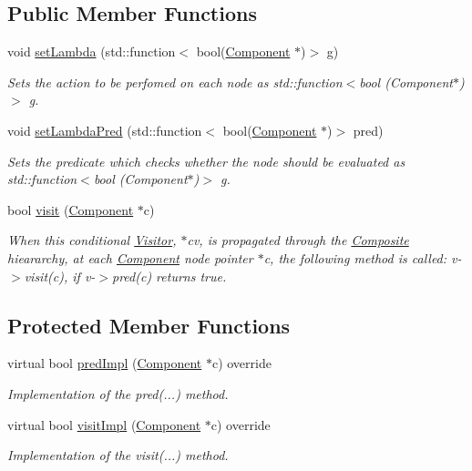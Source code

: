 \subsection*{Public Member Functions}
\begin{DoxyCompactItemize}
\item 
void \hyperlink{classVisitorLambda_a77004dd1388b4b7ebc5d1d6fe1adb747}{set\+Lambda} (std\+::function$<$ bool(\hyperlink{classComponent}{Component} $\ast$)$>$ g)
\begin{DoxyCompactList}\small\item\em Sets the action to be perfomed on each node as std\+::function$<$bool (\+Component$\ast$)$>$ g. \end{DoxyCompactList}\item 
void \hyperlink{classVisitorLambda_a46d9cc856e3fbc7155dd2212981a8902}{set\+Lambda\+Pred} (std\+::function$<$ bool(\hyperlink{classComponent}{Component} $\ast$)$>$ pred)
\begin{DoxyCompactList}\small\item\em Sets the predicate which checks whether the node should be evaluated as std\+::function$<$bool (\+Component$\ast$)$>$ g. \end{DoxyCompactList}\item 
bool \hyperlink{classVisitor_a3f8ea7ad6aa61e99d8d1bc0576bdf23c}{visit} (\hyperlink{classComponent}{Component} $\ast$c)
\begin{DoxyCompactList}\small\item\em When this conditional \hyperlink{classVisitor}{Visitor}, $\ast$cv, is propagated through the \hyperlink{classComposite}{Composite} hieararchy, at each \hyperlink{classComponent}{Component} node pointer $\ast$c, the following method is called\+: v-\/$>$visit(c), if v-\/$>$pred(c) returns true. \end{DoxyCompactList}\end{DoxyCompactItemize}
\subsection*{Protected Member Functions}
\begin{DoxyCompactItemize}
\item 
virtual bool \hyperlink{classTypeVisitorLambda_a3157fca6f97df070135388705836899a}{pred\+Impl} (\hyperlink{classComponent}{Component} $\ast$c) override
\begin{DoxyCompactList}\small\item\em Implementation of the pred(...) method. \end{DoxyCompactList}\item 
virtual bool \hyperlink{classVisitorLambda_af934df1d8669dd315d824d9ee706f250}{visit\+Impl} (\hyperlink{classComponent}{Component} $\ast$c) override
\begin{DoxyCompactList}\small\item\em Implementation of the visit(...) method. \end{DoxyCompactList}\end{DoxyCompactItemize}
